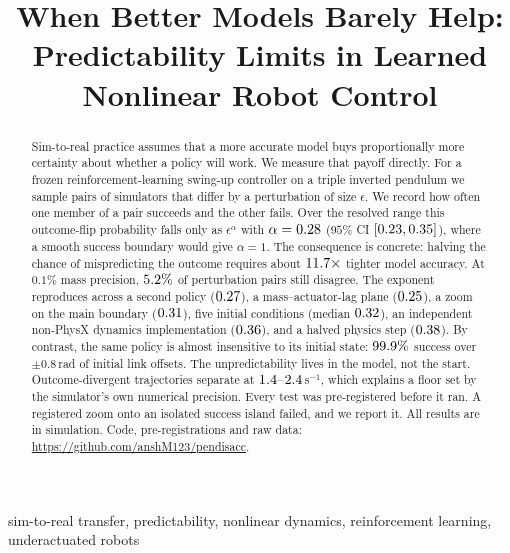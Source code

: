 \documentclass[conference]{IEEEtran}
\newcommand{\repo}{\url{https://github.com/anshM123/pendisacc}}
\begin{document}
\title{When Better Models Barely Help:\\
Predictability Limits in Learned Nonlinear Robot Control}

\author{
}

\maketitle

\begin{abstract}
Sim-to-real practice assumes that a more accurate model buys proportionally more
certainty about whether a policy will work. We measure that payoff directly.
For a frozen reinforcement-learning swing-up controller on a triple inverted
pendulum we sample pairs of simulators that differ by a perturbation of size
$\epsilon$. We record how often one member of a pair
succeeds and the other fails. Over the resolved range this outcome-flip
probability falls only as $\epsilon^{\alpha}$ with $\alpha=0.28$
($95\%$ CI $[0.23,0.35]$), where a smooth success boundary would give
$\alpha=1$. The consequence is concrete: halving the chance of mispredicting the
outcome requires about $11.7\times$ tighter model accuracy. At $0.1\%$
mass precision, $5.2\%$ of perturbation pairs still disagree. The exponent
reproduces across a second policy ($0.27$), a mass--actuator-lag
plane ($0.25$), a zoom on the main boundary ($0.31$), five initial
conditions (median $0.32$), an independent non-PhysX dynamics implementation
($0.36$), and a halved physics step ($0.38$). By contrast, the same policy
is almost insensitive to its initial state: $99.9\%$ success over $\pm0.8$\,rad of
initial link offsets. The unpredictability lives in the model, not the start. Outcome-divergent trajectories
separate at $1.4$--$2.4$\,s$^{-1}$, which explains a floor set by
the simulator's own numerical precision. Every test was pre-registered before it
ran. A registered zoom onto an isolated success island failed, and we report it.
All results are in simulation. Code, pre-registrations and raw data: \repo.
\end{abstract}

\begin{IEEEkeywords}
sim-to-real transfer, predictability, nonlinear dynamics, reinforcement learning, underactuated robots
\end{IEEEkeywords}
\end{document}
